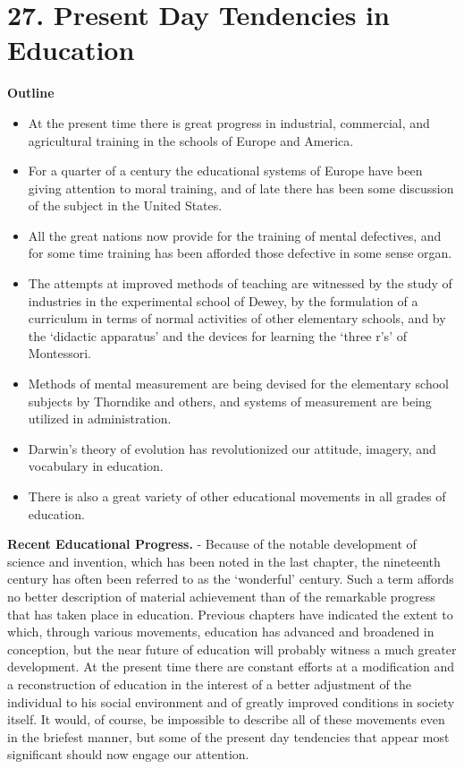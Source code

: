 \documentclass[
]{book}
\providecommand{\tightlist}{%
  \setlength{\itemsep}{0pt}\setlength{\parskip}{0pt}}
\begin{document}
\hypertarget{present-day-tendencies-in-education}{%
\chapter{27. Present Day Tendencies in Education}\label{present-day-tendencies-in-education}}

\textbf{Outline}

\begin{itemize}
\tightlist
\item
  At the present time there is great progress in industrial, commercial, and agricultural training in the schools of Europe and America.
\item
  For a quarter of a century the educational systems of Europe have been giving attention to moral training, and of late there has been some discussion of the subject in the United States.
\item
  All the great nations now provide for the training of mental defectives, and for some time training has been afforded those defective in some sense organ.
\item
  The attempts at improved methods of teaching are witnessed by the study of industries in the experimental school of Dewey, by the formulation of a curriculum in terms of normal activities of other elementary schools, and by the `didactic apparatus' and the devices for learning the `three r's' of Montessori.
\item
  Methods of mental measurement are being devised for the elementary school subjects by Thorndike and others, and systems of measurement are being utilized in administration.
\item
  Darwin's theory of evolution has revolutionized our attitude, imagery, and vocabulary in education.
\item
  There is also a great variety of other educational movements in all grades of education.
\end{itemize}

\textbf{Recent Educational Progress.} - Because of the notable development of science and invention, which has been noted in the last chapter, the nineteenth century has often been referred to as the `wonderful' century. Such a term affords no better description of material achievement than of the remarkable progress that has taken place in education. Previous chapters have indicated the extent to which, through various movements, education has advanced and broadened in conception, but the near future of education will probably witness a much greater development. At the present time there are constant efforts at a modification and a reconstruction of education in the interest of a better adjustment of the individual to his social environment and of greatly improved conditions in society itself. It would, of course, be impossible to describe all of these movements even in the briefest manner, but some of the present day tendencies that appear most significant should now engage our attention.
\end{document}
